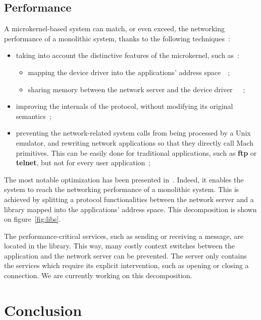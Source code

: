 \subsection{Performance}

A microkernel-based system can match, or even exceed, the networking 
 performance of a monolithic system, thanks to the following techniques~:
\begin{itemize}
\item taking into account the distinctive features of the microkernel, such as~:
	\begin{itemize}
	\item mapping the device driver into the applications' address 
space~\cite{Forin91}~;
	\item sharing memory between the network server and the device 
driver~~\cite{Reynolds91}~;
	\end{itemize}
\item improving the internals of the protocol, without modifying its 
original semantics~;
\item preventing the network-related system calls from being processed by a 
Unix emulator, and rewriting network applications so that they directly call Mach primitives.
This can be easily done for traditional applications, such as
 {\bf ftp} or {\bf telnet}, but not for every user application~;
\end{itemize}


The most notable optimization has been presented in~\cite{Maeda93}.
Indeed, it enables the system to reach the networking performance of a 
monolithic system. This is achieved by splitting a protocol functionalities 
between the network server and a library mapped into the applications' 
address space. This decomposition is shown on figure~\ref{fig:libs}.

The performance-critical services, such as sending or receiving a message, 
are located in the library. This way, many costly context switches between 
the application and the network server can be prevented. The server only 
contains the services which require its explicit intervention, such as 
opening or closing a connection. We are currently working on this 
decomposition.

\section{Conclusion}

